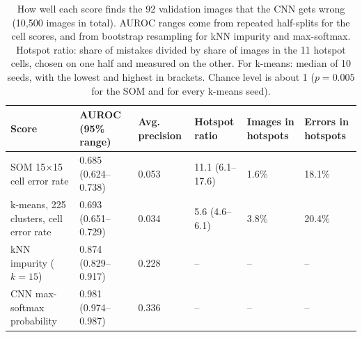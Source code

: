 \begin{table}[H]
\centering
\renewcommand{\arraystretch}{1.15}
\small
\begin{tabular}{|p{}|p{}|p{}|p{}|p{}|p{}|}
\hline
\textbf{Score} & \textbf{AUROC (95\% range)} & \textbf{Avg. precision} & \textbf{Hotspot ratio} & \textbf{Images in hotspots} & \textbf{Errors in hotspots} \\ \hline
SOM 15$\times$15 cell error rate & 0.685 (0.624--0.738) & 0.053 & 11.1 (6.1--17.6) & 1.6\% & 18.1\% \\ \hline
k-means, 225 clusters, cell error rate & 0.693 (0.651--0.729) & 0.034 & 5.6 (4.6--6.1) & 3.8\% & 20.4\% \\ \hline
kNN impurity ($k=15$) & 0.874 (0.829--0.917) & 0.228 & -- & -- & -- \\ \hline
CNN max-softmax probability & 0.981 (0.974--0.987) & 0.336 & -- & -- & -- \\ \hline
\end{tabular}
\caption{How well each score finds the 92 validation images that the CNN gets wrong (10,500 images in total). AUROC ranges come from repeated half-splits for the cell scores, and from bootstrap resampling for kNN impurity and max-softmax. Hotspot ratio: share of mistakes divided by share of images in the 11 hotspot cells, chosen on one half and measured on the other. For k-means: median of 10 seeds, with the lowest and highest in brackets. Chance level is about 1 ($p=0.005$ for the SOM and for every k-means seed).}
\label{tab:error-pattern-baselines}
\end{table}
